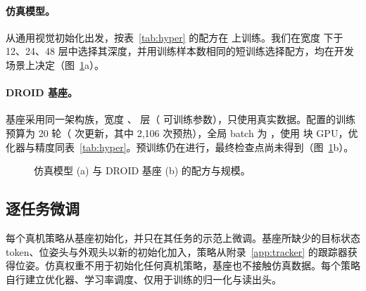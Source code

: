 \paragraph{仿真模型。}\ours 从通用视觉初始化出发，按表~\ref{tab:hyper} 的配方在 \bench 上训练。我们在宽度 \cfgWidth{} 下于 12、24、48 层中选择其深度，并用训练样本数相同的短训练选择配方，均在开发场景上决定（图~\ref{fig:scaling}a）。

\paragraph{DROID 基座。}基座采用同一架构族，宽度 \cfgWidth{}、\cfgBaseLayers{} 层（\cfgBaseParams{} 可训练参数），只使用真实数据。配置的训练预算为 20 轮（\cfgBaseUpdates{} 次更新，其中 2{,}106 次预热），全局 batch 为 \cfgBatch{}，使用 \cfgBaseGPUs{} 块 GPU，优化器与精度同表~\ref{tab:hyper}。预训练仍在进行，最终检查点尚未得到（图~\ref{fig:scaling}b）。

\begin{figure}[t]
\centering
{}
\caption{仿真模型 (a) 与 DROID 基座 (b) 的配方与规模。}
\label{fig:scaling}
\end{figure}

\subsection{逐任务微调}
\label{app:posttraining}
每个真机策略从基座初始化，并只在其任务的示范上微调。基座所缺少的目标状态 token、位姿头与外观头以新的初始化加入，策略从附录~\ref{app:tracker} 的跟踪器获得位姿。仿真权重不用于初始化任何真机策略，基座也不接触仿真数据。每个策略自行建立优化器、学习率调度、仅用于训练的归一化与读出头。
